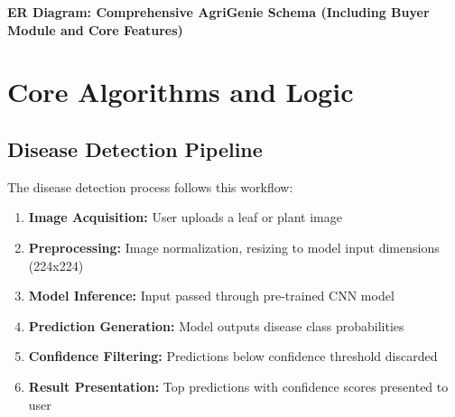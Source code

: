 \documentclass[12pt,a4paper]{report}
\begin{document}
\begin{center}
{
}
    \vspace{2mm}
    \textbf{ER Diagram: Comprehensive AgriGenie Schema (Including Buyer Module and Core Features)}
    \end{center}
\clearpage

\section{Core Algorithms and Logic}

\subsection{Disease Detection Pipeline}

The disease detection process follows this workflow:

\begin{enumerate}
    \item \textbf{Image Acquisition:} User uploads a leaf or plant image
    \item \textbf{Preprocessing:} Image normalization, resizing to model input dimensions (224x224)
    \item \textbf{Model Inference:} Input passed through pre-trained CNN model
    \item \textbf{Prediction Generation:} Model outputs disease class probabilities
    \item \textbf{Confidence Filtering:} Predictions below confidence threshold discarded
    \item \textbf{Result Presentation:} Top predictions with confidence scores presented to user
\end{enumerate}
\end{document}
